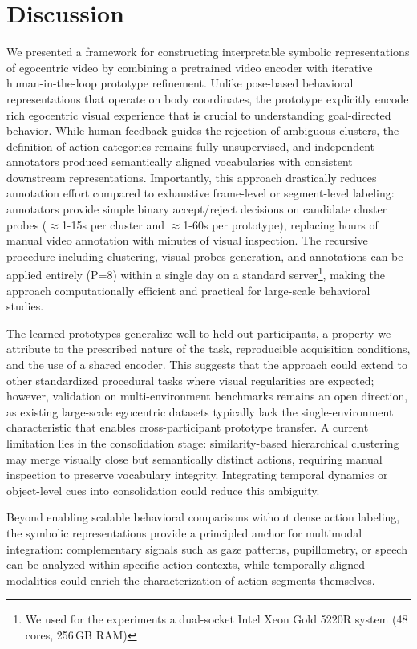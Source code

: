 \documentclass[runningheads]{llncs}
\begin{document}
\section{Discussion}
    \label{sec:chapter_5_conclusion}

    We presented a framework for constructing interpretable symbolic representations of egocentric video by combining a pretrained video encoder with iterative human-in-the-loop prototype refinement. Unlike pose-based behavioral representations that operate on body coordinates, the prototype explicitly encode rich egocentric visual experience that is crucial to understanding goal-directed behavior. While human feedback guides the rejection of ambiguous clusters, the definition of action categories remains fully unsupervised, and independent annotators produced semantically aligned vocabularies with consistent downstream representations. Importantly, this approach drastically reduces annotation effort compared to exhaustive frame-level or segment-level labeling: annotators provide simple binary accept/reject decisions on candidate cluster probes ($\approx$1-15s per cluster and $\approx$1-60s per prototype), replacing hours of manual video annotation with minutes of visual inspection. The recursive procedure including clustering, visual probes generation, and annotations can be applied entirely (P=8) within a single day on a standard server\footnote{We used for the experiments a dual-socket Intel Xeon Gold 5220R system (48 cores, 256 GB RAM)}, making the approach computationally efficient and practical for large-scale behavioral studies.

    The learned prototypes generalize well to held-out participants, a property we attribute to the prescribed nature of the task, reproducible acquisition conditions, and the use of a shared encoder. This suggests that the approach could extend to other standardized procedural tasks where visual regularities are expected; however, validation on multi-environment benchmarks remains an open direction, as existing large-scale egocentric datasets typically lack the single-environment characteristic that enables cross-participant prototype transfer. A current limitation lies in the consolidation stage: similarity-based hierarchical clustering may merge visually close but semantically distinct actions, requiring manual inspection to preserve vocabulary integrity. Integrating temporal dynamics or object-level cues into consolidation could reduce this ambiguity.

    Beyond enabling scalable behavioral comparisons without dense action labeling, the symbolic representations provide a principled anchor for multimodal integration: complementary signals such as gaze patterns, pupillometry, or speech can be analyzed within specific action contexts, while temporally aligned modalities could enrich the characterization of action segments themselves.
\end{document}
